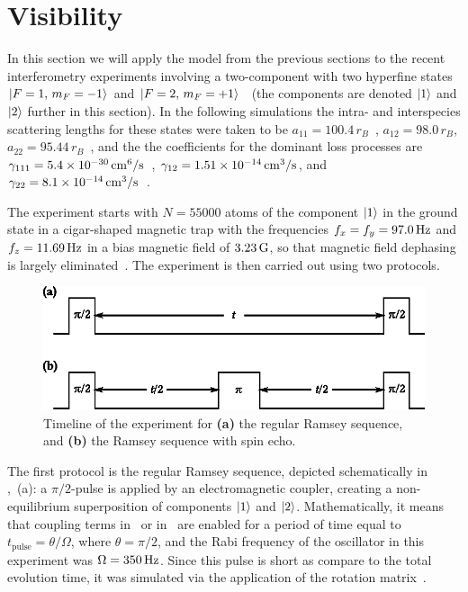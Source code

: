\section{Visibility}

In this section we will apply the model from the previous sections to the recent interferometry experiments involving a two-component \Rb{}  with two hyperfine states ${\mbox{\ensuremath{\left\vert F=1,\, m_F=-1 \right\rangle}}}$ and ${\mbox{\ensuremath{\left\vert F=2,\, m_F=+1 \right\rangle}}}$~\cite{Egorov2011} (the components are denoted $\mbox{\ensuremath{\left\vert 1 \right\rangle}}$ and $\mbox{\ensuremath{\left\vert 2 \right\rangle}}$ further in this section).
In the following simulations the intra- and interspecies scattering lengths for these states were taken to be $a_{11} = 100.4\,r_B$~\cite{Widera2006,Mertes2007}, $a_{12} = 98.0\,r_B$, $a_{22} = 95.44\,r_B$~\cite{Egorov2013}, and the the coefficients for the dominant loss processes are $\gamma_{111} = 5.4 \times 10^{-30} \mbox{\ensuremath{\,\mathrm{cm^6/s}}}$~\cite{Mertes2007}, $\gamma_{12} = 1.51 \times 10^{-14}\mbox{\ensuremath{\,\mathrm{cm^3/s}}}$, and $\gamma_{22} = 8.1 \times 10^{-14} \mbox{\ensuremath{\,\mathrm{cm^3/s}}}$~\cite{Egorov2013}.

The experiment starts with $N = 55000$ atoms of the component $\mbox{\ensuremath{\left\vert 1 \right\rangle}}$ in the ground state in a cigar-shaped magnetic trap with the frequencies $f_x = f_y = 97.0\mbox{\ensuremath{\,\mathrm{Hz}}}$ and $f_z = 11.69\mbox{\ensuremath{\,\mathrm{Hz}}}$ in a bias magnetic field of $3.23\mbox{\ensuremath{\,\mathrm{G}}}$, so that magnetic field dephasing is largely eliminated~\cite{Hall1998}.
The experiment is then carried out using two protocols.

\begin{figure}
    \centerline{\includegraphics{figures_precreated/sequences.eps}}
    \caption[Timeline of Ramsey and spin echo experimental sequences]{
    Timeline of the experiment for \textbf{(a)} the regular Ramsey sequence, and \textbf{(b)} the Ramsey sequence with spin echo.}%
    \label{fig:bec-noise:visibility:sequences}
\end{figure}

The first protocol is the regular Ramsey sequence, depicted schematically in ,~(a): a $\pi/2$-pulse is applied by an electromagnetic coupler, creating a non-equilibrium superposition of components $\mbox{\ensuremath{\left\vert 1 \right\rangle}}$ and $\mbox{\ensuremath{\left\vert 2 \right\rangle}}$.
Mathematically, it means that coupling terms in~ or in~ are enabled for a period of time equal to $t_{\mathrm{pulse}} = \theta / \Omega$, where $\theta = \pi/2$, and the Rabi frequency of the oscillator in this experiment was $\Omega = 350\mbox{\ensuremath{\,\mathrm{Hz}}}$.
Since this pulse is short as compare to the total evolution time, it was simulated via the application of the rotation matrix~.

